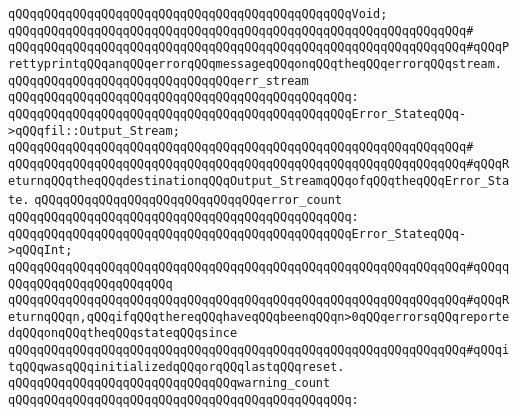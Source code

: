 \verb|qQQqqQQqqQQqqQQqqQQqqQQqqQQqqQQqqQQqqQQqqQQqqQQqVoid;|\newline
\verb|qQQqqQQqqQQqqQQqqQQqqQQqqQQqqQQqqQQqqQQqqQQqqQQqqQQqqQQqqQQqqQQq#|\newline
\verb|qQQqqQQqqQQqqQQqqQQqqQQqqQQqqQQqqQQqqQQqqQQqqQQqqQQqqQQqqQQqqQQq#qQQqPrettyprintqQQqanqQQqerrorqQQqmessageqQQqonqQQqtheqQQqerrorqQQqstream.|\newline
\newline
\newline
\newline
\verb|qQQqqQQqqQQqqQQqqQQqqQQqqQQqqQQqerr_stream|\newline
\verb|qQQqqQQqqQQqqQQqqQQqqQQqqQQqqQQqqQQqqQQqqQQqqQQq:|\newline
\verb|qQQqqQQqqQQqqQQqqQQqqQQqqQQqqQQqqQQqqQQqqQQqqQQqError_StateqQQq->qQQqfil::Output_Stream;|\newline
\verb|qQQqqQQqqQQqqQQqqQQqqQQqqQQqqQQqqQQqqQQqqQQqqQQqqQQqqQQqqQQqqQQq#|\newline
\verb|qQQqqQQqqQQqqQQqqQQqqQQqqQQqqQQqqQQqqQQqqQQqqQQqqQQqqQQqqQQqqQQq#qQQqReturnqQQqtheqQQqdestinationqQQqOutput_StreamqQQqofqQQqtheqQQqError_State.|\newline
\newline
\newline
\newline
\verb|qQQqqQQqqQQqqQQqqQQqqQQqqQQqqQQqerror_count|\newline
\verb|qQQqqQQqqQQqqQQqqQQqqQQqqQQqqQQqqQQqqQQqqQQqqQQq:|\newline
\verb|qQQqqQQqqQQqqQQqqQQqqQQqqQQqqQQqqQQqqQQqqQQqqQQqError_StateqQQq->qQQqInt;|\newline
\verb|qQQqqQQqqQQqqQQqqQQqqQQqqQQqqQQqqQQqqQQqqQQqqQQqqQQqqQQqqQQqqQQq#qQQqqQQqqQQqqQQqqQQqqQQqqQQq|\newline
\verb|qQQqqQQqqQQqqQQqqQQqqQQqqQQqqQQqqQQqqQQqqQQqqQQqqQQqqQQqqQQqqQQq#qQQqReturnqQQqn,qQQqifqQQqthereqQQqhaveqQQqbeenqQQqn>0qQQqerrorsqQQqreportedqQQqonqQQqtheqQQqstateqQQqsince|\newline
\verb|qQQqqQQqqQQqqQQqqQQqqQQqqQQqqQQqqQQqqQQqqQQqqQQqqQQqqQQqqQQqqQQq#qQQqitqQQqwasqQQqinitializedqQQqorqQQqlastqQQqreset.|\newline
\newline
\newline
\newline
\verb|qQQqqQQqqQQqqQQqqQQqqQQqqQQqqQQqwarning_count|\newline
\verb|qQQqqQQqqQQqqQQqqQQqqQQqqQQqqQQqqQQqqQQqqQQqqQQq:|\newline
